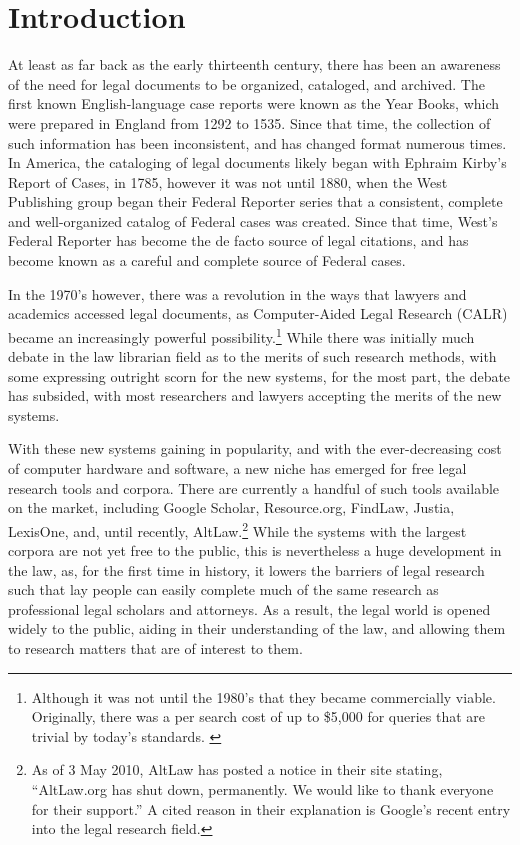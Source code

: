 \label{intro}
\section{Introduction}
At least as far back as the early thirteenth century, there has been an awareness of the need for legal documents to be organized, cataloged, and archived. The first known English-language case reports were known as the Year Books, which were prepared in England from 1292 to 1535.\cite{berring_legal_1987} Since that time, the collection of such information has been inconsistent, and has changed format numerous times. 
In America, the cataloging of legal documents likely began with Ephraim Kirby's Report of Cases,\cite{kirby_reports_1788} in 1785, however it was not until 1880, when the West Publishing group began their Federal Reporter series that a consistent, complete and well-organized catalog of Federal cases was created. Since that time, West's Federal Reporter has become the de facto source of legal citations, and has become known as a careful and complete source of Federal cases. 

In the 1970's however, there was a revolution in the ways that lawyers and academics accessed legal documents, as Computer-Aided Legal Research (CALR) became an increasingly powerful possibility.\footnote{Although it was not until the 1980's that they became commercially viable. Originally, there was a per search cost of up to \$5,000 for queries that are trivial by today's standards. \cite{harrington_brief_1984}} While there was initially much debate in the law librarian field as to the merits of such research methods, with some expressing outright scorn for the new systems, for the most part, the debate has subsided, with most researchers and lawyers accepting the merits of the new systems.

With these new systems gaining in popularity, and with the ever-decreasing cost of computer hardware and software, a new niche has emerged for free legal research tools and corpora. There are currently a handful of such tools available on the market, including Google Scholar, Resource.org, FindLaw, Justia, LexisOne, and, until recently, AltLaw.\footnote{As of 3 May 2010, AltLaw has posted a notice in their site stating, ``AltLaw.org has shut down, permanently. We would like to thank everyone for their support.'' A cited reason in their explanation is Google's recent entry into the legal research field.}
While the systems with the largest corpora are not yet free to the public, this is nevertheless a huge development in the law, as, for the first time in history, it lowers the barriers of legal research such that lay people can easily complete much of the same research as professional legal scholars and attorneys. As a result, the legal world is opened widely to the public, aiding in their understanding of the law, and allowing them to research matters that are of interest to them.

